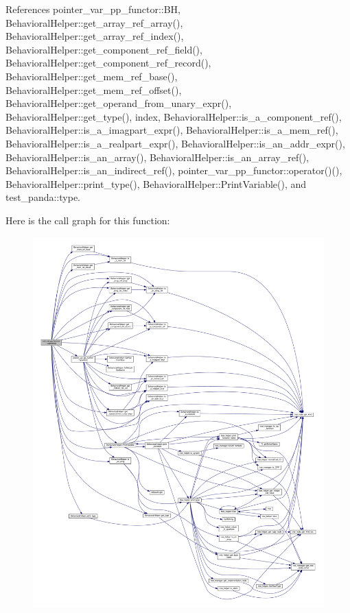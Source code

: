 References pointer\+\_\+var\+\_\+pp\+\_\+functor\+::\+BH, Behavioral\+Helper\+::get\+\_\+array\+\_\+ref\+\_\+array(), Behavioral\+Helper\+::get\+\_\+array\+\_\+ref\+\_\+index(), Behavioral\+Helper\+::get\+\_\+component\+\_\+ref\+\_\+field(), Behavioral\+Helper\+::get\+\_\+component\+\_\+ref\+\_\+record(), Behavioral\+Helper\+::get\+\_\+mem\+\_\+ref\+\_\+base(), Behavioral\+Helper\+::get\+\_\+mem\+\_\+ref\+\_\+offset(), Behavioral\+Helper\+::get\+\_\+operand\+\_\+from\+\_\+unary\+\_\+expr(), Behavioral\+Helper\+::get\+\_\+type(), index, Behavioral\+Helper\+::is\+\_\+a\+\_\+component\+\_\+ref(), Behavioral\+Helper\+::is\+\_\+a\+\_\+imagpart\+\_\+expr(), Behavioral\+Helper\+::is\+\_\+a\+\_\+mem\+\_\+ref(), Behavioral\+Helper\+::is\+\_\+a\+\_\+realpart\+\_\+expr(), Behavioral\+Helper\+::is\+\_\+an\+\_\+addr\+\_\+expr(), Behavioral\+Helper\+::is\+\_\+an\+\_\+array(), Behavioral\+Helper\+::is\+\_\+an\+\_\+array\+\_\+ref(), Behavioral\+Helper\+::is\+\_\+an\+\_\+indirect\+\_\+ref(), pointer\+\_\+var\+\_\+pp\+\_\+functor\+::operator()(), Behavioral\+Helper\+::print\+\_\+type(), Behavioral\+Helper\+::\+Print\+Variable(), and test\+\_\+panda\+::type.

Here is the call graph for this function\+:
\nopagebreak
\begin{figure}[H]
\begin{center}
\leavevmode
\includegraphics[width=350pt]{d4/d4a/structstd__var__pp__functor_a0fe9aed55084be9ea80846ad5ceee014_cgraph}
\end{center}
\end{figure}


